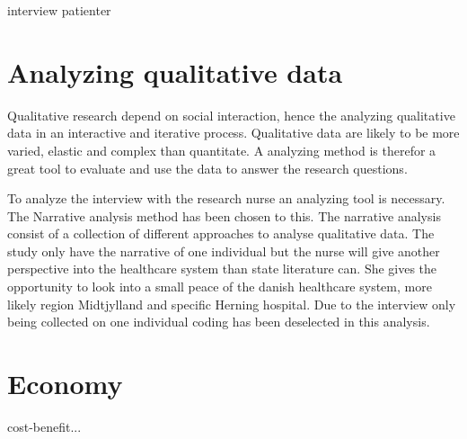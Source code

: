 interview patienter

\section{Analyzing qualitative data}


Qualitative research depend on social interaction, hence the analyzing qualitative data in an interactive and iterative process. Qualitative data are likely to be more varied, elastic and complex than quantitate. A analyzing method is therefor a great tool to evaluate and use the data to answer the research questions. 

To analyze the interview with the research nurse an analyzing tool is necessary. The Narrative analysis method has been chosen to this. The narrative analysis consist of a collection of different approaches to analyse qualitative data. 
 The study only have the narrative of one individual but the nurse will give another perspective into the healthcare system than state literature can. She gives the opportunity to look into a small peace of the danish healthcare system, more likely region Midtjylland and specific Herning hospital. Due to the interview only being collected on one individual coding has been deselected in this analysis.  


\section{Economy}


cost-benefit...









